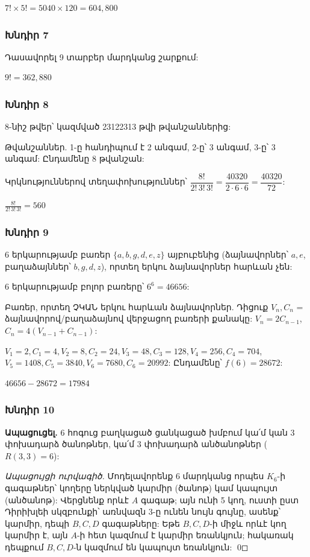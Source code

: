 $\boxed{7! \times 5! = 5040 \times 120 = 604{,}800}$

\subsubsection*{Խնդիր 7}
Դասավորել 9 տարբեր մարդկանց շարքում:

$\boxed{9! = 362{,}880}$

\subsubsection*{Խնդիր 8}
8-նիշ թվեր՝ կազմված 23122313 թվի թվանշաններից:

Թվանշաններ. 1-ը հանդիպում է 2 անգամ, 2-ը՝ 3 անգամ, 3-ը՝ 3 անգամ: Ընդամենը 8 թվանշան:

Կրկնություններով տեղափոխություններ՝ $\dfrac{8!}{2!\,3!\,3!} = \dfrac{40320}{2\cdot6\cdot6} = \dfrac{40320}{72}$:

$\boxed{\frac{8!}{2!\,3!\,3!} = 560}$

\subsubsection*{Խնդիր 9}
6 երկարությամբ բառեր $\{a, b, g, d, e, z\}$ այբուբենից (ձայնավորներ՝ $a, e$, բաղաձայններ՝ $b, g, d, z$), որտեղ երկու ձայնավորներ հարևան չեն:

6 երկարությամբ բոլոր բառերը՝ $6^6 = 46656$:

Բառեր, որտեղ ՉԿԱՆ երկու հարևան ձայնավորներ. Դիցուք $V_n, C_n$ = ձայնավորով/բաղաձայնով վերջացող բառերի քանակը: $V_n = 2C_{n-1}$, $C_n = 4(V_{n-1}+C_{n-1})$:

$V_1=2, C_1=4, V_2=8, C_2=24, V_3=48, C_3=128, V_4=256, C_4=704$,
$V_5=1408, C_5=3840, V_6=7680, C_6=20992$: Ընդամենը՝ $f(6)=28672$:

$\boxed{46656 - 28672 = 17984}$

\subsubsection*{Խնդիր 10}
\textbf{Ապացուցել.} 6 հոգուց բաղկացած ցանկացած խմբում կա՛մ կան 3 փոխադարձ ծանոթներ, կա՛մ 3 փոխադարձ անծանոթներ ($R(3,3)=6$):

\textit{Ապացույցի ուրվագիծ.}
Մոդելավորենք 6 մարդկանց որպես $K_6$-ի գագաթներ՝ կողերը ներկված կարմիր (ծանոթ) կամ կապույտ (անծանոթ): Վերցնենք որևէ $A$ գագաթ; այն ունի 5 կող, ուստի ըստ Դիրիխլեի սկզբունքի՝ առնվազն 3-ը ունեն նույն գույնը, ասենք՝ կարմիր, դեպի $B,C,D$ գագաթները: Եթե $B,C,D$-ի միջև որևէ կող կարմիր է, այն $A$-ի հետ կազմում է կարմիր եռանկյուն; հակառակ դեպքում $B,C,D$-ն կազմում են կապույտ եռանկյուն: \qed

